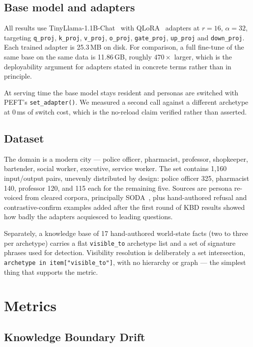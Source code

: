 \documentclass[conference]{IEEEtran}
\begin{document}
\subsection{Base model and adapters}

All results use TinyLlama-1.1B-Chat~\cite{zhang2024tinyllama} with
QLoRA~\cite{dettmers2023qlora, hu2022lora} adapters at $r=16$, $\alpha=32$,
targeting \texttt{q\_proj}, \texttt{k\_proj}, \texttt{v\_proj}, \texttt{o\_proj},
\texttt{gate\_proj}, \texttt{up\_proj} and \texttt{down\_proj}. Each trained
adapter is 25.3\,MB on disk. For comparison, a full fine-tune of the same base
on the same data is 11.86\,GB, roughly $470\times$ larger, which is the
deployability argument for adapters stated in concrete terms rather than in
principle.

At serving time the base model stays resident and personas are switched with
PEFT's \texttt{set\_adapter()}. We measured a second call against a different
archetype at 0\,ms of switch cost, which is the no-reload claim verified rather
than asserted.

\subsection{Dataset}

The domain is a modern city --- police officer, pharmacist, professor,
shopkeeper, bartender, social worker, executive, service worker. The set
contains 1{,}160 input/output pairs, unevenly distributed by design: police
officer 325, pharmacist 140, professor 120, and 115 each for the remaining five.
Sources are persona re-voiced from cleared corpora, principally
SODA~\cite{kim2023soda}, plus hand-authored refusal and contrastive-confirm
examples added after the first round of KBD results showed how badly the
adapters acquiesced to leading questions.

Separately, a knowledge base of 17 hand-authored world-state facts (two to three
per archetype) carries a flat \texttt{visible\_to} archetype list and a set of
signature phrases used for detection. Visibility resolution is deliberately a
set intersection, \texttt{archetype in item["visible\_to"]}, with no hierarchy
or graph --- the simplest thing that supports the metric.

\section{Metrics} \label{sec:metrics}

\subsection{Knowledge Boundary Drift}
\end{document}
